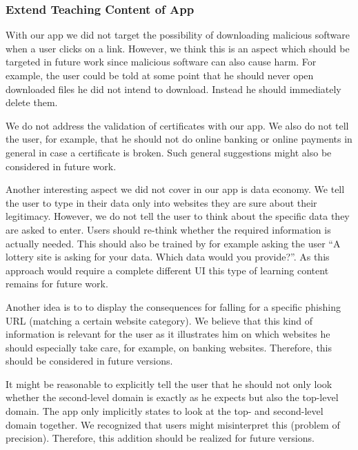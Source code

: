 \subsubsection{Extend Teaching Content of App}
\begin{description}[leftmargin=0cm]
\item[Malicious Downloads:] With our app we did not target the possibility of downloading malicious software when a user clicks on a link.
	However, we think this is an aspect which should be targeted in future work since malicious software can also cause harm.
	For example, the user could be told at some point that he should never open downloaded files he did not intend to download.
	Instead he should immediately delete them.
	\item[Certificate Validation:] We do not address the validation of certificates with our app. We also do not tell the user, for example, that he should not do online banking or online payments in general in case a certificate is broken.
	Such general suggestions might also be considered in future work.
	\item[Data Economy:] Another interesting aspect we did not cover in our app is data economy.
	We tell the user to type in their data only into websites they are sure about their legitimacy.
	However, we do not tell the user to think about the specific data they are asked to enter.
	Users should re-think whether the required information is actually needed.
	This should also be trained by for example asking the user ``A lottery site is asking for your data. Which data would you provide?''. As this approach would require a complete different UI this type of learning content remains for future work.
	\item[Consequences:] Another idea is to to display the consequences for falling for a specific phishing URL (matching a certain website category).
We believe that this kind of information is relevant for the user as it illustrates him on which websites he should especially take care, for example, on banking websites. Therefore, this should be considered in future versions.
	\item[Top-Level Domain Attacks:] It might be reasonable to explicitly tell the user that he should not only look whether the second-level domain is exactly as he expects but also the top-level domain. The app only implicitly states to look at the top- and second-level domain together.
We recognized that users might misinterpret this (problem of precision).
Therefore, this addition should be realized for future versions.

\end{description}
